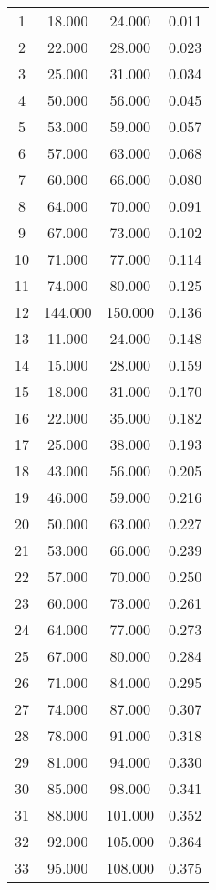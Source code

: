 % 
\begin{tabular}{cccc}
  \hline
  \hline
1 & 18.000 & 24.000 & 0.011 \\ 
  2 & 22.000 & 28.000 & 0.023 \\ 
  3 & 25.000 & 31.000 & 0.034 \\ 
  4 & 50.000 & 56.000 & 0.045 \\ 
  5 & 53.000 & 59.000 & 0.057 \\ 
  6 & 57.000 & 63.000 & 0.068 \\ 
  7 & 60.000 & 66.000 & 0.080 \\ 
  8 & 64.000 & 70.000 & 0.091 \\ 
  9 & 67.000 & 73.000 & 0.102 \\ 
  10 & 71.000 & 77.000 & 0.114 \\ 
  11 & 74.000 & 80.000 & 0.125 \\ 
  12 & 144.000 & 150.000 & 0.136 \\ 
  13 & 11.000 & 24.000 & 0.148 \\ 
  14 & 15.000 & 28.000 & 0.159 \\ 
  15 & 18.000 & 31.000 & 0.170 \\ 
  16 & 22.000 & 35.000 & 0.182 \\ 
  17 & 25.000 & 38.000 & 0.193 \\ 
  18 & 43.000 & 56.000 & 0.205 \\ 
  19 & 46.000 & 59.000 & 0.216 \\ 
  20 & 50.000 & 63.000 & 0.227 \\ 
  21 & 53.000 & 66.000 & 0.239 \\ 
  22 & 57.000 & 70.000 & 0.250 \\ 
  23 & 60.000 & 73.000 & 0.261 \\ 
  24 & 64.000 & 77.000 & 0.273 \\ 
  25 & 67.000 & 80.000 & 0.284 \\ 
  26 & 71.000 & 84.000 & 0.295 \\ 
  27 & 74.000 & 87.000 & 0.307 \\ 
  28 & 78.000 & 91.000 & 0.318 \\ 
  29 & 81.000 & 94.000 & 0.330 \\ 
  30 & 85.000 & 98.000 & 0.341 \\ 
  31 & 88.000 & 101.000 & 0.352 \\ 
  32 & 92.000 & 105.000 & 0.364 \\ 
  33 & 95.000 & 108.000 & 0.375 \\ 

\end{tabular}
